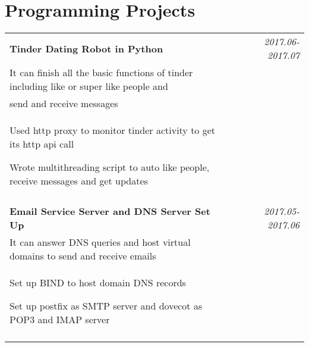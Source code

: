 \documentclass[a4paper,10pt]{article}
\begin{document}
\section{Programming Projects}
\begin{tabular}{p{13.5cm}p{0.5cm}r}

\textbf{Tinder Dating Robot in Python} && \emph{2017.06-2017.07} \\
\hspace{1em} It can finish all the basic functions of tinder including like or super like people and && \vspace{-0.5em}\\
\hspace{1em} send and receive messages && \vspace{-0.5em} \\
\begin{compactitem}
  \item Used http proxy to monitor tinder activity to get its http api call\vspace{0.2em}
  \item Wrote multithreading script to auto like people, receive messages and get updates\vspace{0.2em}
\end{compactitem}&&\vspace{-2.2em} \\
\multicolumn{3}{c}{} \\


\textbf{Email Service Server and DNS Server Set Up} && \emph{2017.05-2017.06} \\
\hspace{1em} It can answer DNS queries and host virtual domains to send and receive emails && \vspace{-0.5em} \\
\begin{compactitem}
  \item Set up BIND to host domain DNS records \vspace{0.2em}
  \item Set up postfix as SMTP server and dovecot as POP3 and IMAP server \vspace{0.2em}  
\end{compactitem}&&\vspace{-2.2em} \\
\multicolumn{3}{c}{} \\



\end{tabular}
\end{document}
